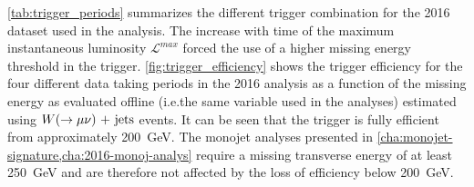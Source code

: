 \cref{tab:trigger_periods} summarizes the different trigger combination for the
2016 dataset used in the analysis. The increase with time of the maximum
instantaneous luminosity $\mathcal{L}^{max}$ forced the use of a higher missing
energy threshold in the trigger. \cref{fig:trigger_efficiency} shows the trigger
efficiency for the four different data taking periods in the 2016 analysis as a
function of the missing energy as evaluated offline (i.e.\@ the same variable
used in the analyses) estimated using $W (\rightarrow \mu \nu)\mathrm{~+~jets}$ events. It can be seen
that the trigger is fully efficient from approximately 200~GeV. The monojet
analyses presented in \cref{cha:monojet-signature,cha:2016-monoj-analys} require
a missing transverse energy of at least 250~GeV and are therefore not affected
by the loss of efficiency below 200~GeV.
\begin{table}[!ht]
  \centering
\caption{The table reports the trigger used in the 2016 data taking. The maximum
  instantaneous luminosity $\mathcal{L}^{max} (10^{30} cm^{-2}s^{-1})$ is also
  reported. The constant increasing of $\mathcal{L}^{max}$ justifies the choice
  of higher $\met$ thresholds for the trigger.}
  \label{tab:trigger_periods}
\end{table}
